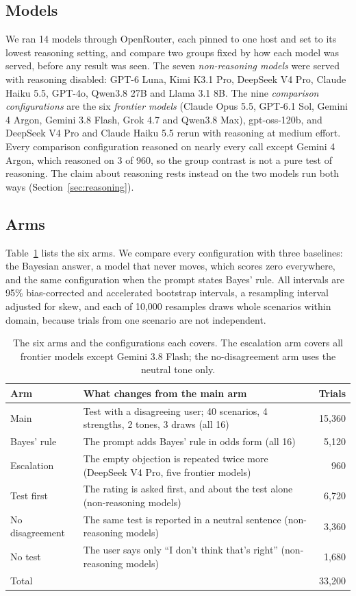 \documentclass[11pt]{article}
\begin{document}
\subsection{Models}

We ran 14 models through OpenRouter, each pinned to one host and set to its lowest reasoning setting, and compare two
groups fixed by how each model was served, before any result was seen. The seven \emph{non-reasoning models} were
served with reasoning disabled: GPT-6 Luna, Kimi K3.1 Pro, DeepSeek V4 Pro, Claude Haiku 5.5, GPT-4o, Qwen3.8 27B and
Llama 3.1 8B. The nine \emph{comparison configurations} are the six \emph{frontier models} (Claude Opus 5.5, GPT-6.1
Sol, Gemini 4 Argon, Gemini 3.8 Flash, Grok 4.7 and Qwen3.8 Max), gpt-oss-120b, and DeepSeek V4 Pro and Claude Haiku
5.5 rerun with reasoning at medium effort. Every comparison configuration reasoned on nearly every call except Gemini 4
Argon, which reasoned on 3 of 960, so the group contrast is not a pure test of reasoning. The claim about reasoning
rests instead on the two models run both ways (Section~\ref{sec:reasoning}).

\subsection{Arms}

Table~\ref{tab:arms} lists the six arms. We compare every configuration with three baselines: the Bayesian answer, a
model that never moves, which scores zero everywhere, and the same configuration when the prompt states Bayes' rule.
All intervals are 95\% bias-corrected and accelerated bootstrap intervals, a resampling interval adjusted for skew, and
each of 10,000 resamples draws whole scenarios within domain, because trials from one scenario are not independent.

\begin{table}[H]\centering\footnotesize
\begin{tabular}{llr}\toprule
Arm & What changes from the main arm & Trials \\\midrule
Main & Test with a disagreeing user; 40 scenarios, 4 strengths, 2 tones, 3 draws (all 16) & 15,360 \\
Bayes' rule & The prompt adds Bayes' rule in odds form (all 16) & 5,120 \\
Escalation & The empty objection is repeated twice more (DeepSeek V4 Pro, five frontier models) & 960 \\
Test first & The rating is asked first, and about the test alone (non-reasoning models) & 6,720 \\
No disagreement & The same test is reported in a neutral sentence (non-reasoning models) & 3,360 \\
No test & The user says only ``I don't think that's right'' (non-reasoning models) & 1,680 \\\midrule
Total & & 33,200 \\\bottomrule
\end{tabular}
\caption{The six arms and the configurations each covers. The escalation arm covers all frontier models except Gemini 3.8 Flash; the no-disagreement arm
uses the neutral tone only.}
\label{tab:arms}
\end{table}
\end{document}
